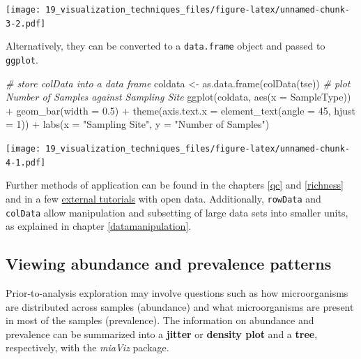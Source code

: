 \documentclass[
]{book}
\newenvironment{Shaded}{\begin{snugshade}}{\end{snugshade}}
\newcommand{\AttributeTok}[1]{\textcolor[rgb]{0.77,0.63,0.00}{#1}}
\newcommand{\CommentTok}[1]{\textcolor[rgb]{0.56,0.35,0.01}{\textit{#1}}}
\newcommand{\DecValTok}[1]{\textcolor[rgb]{0.00,0.00,0.81}{#1}}
\newcommand{\FloatTok}[1]{\textcolor[rgb]{0.00,0.00,0.81}{#1}}
\newcommand{\FunctionTok}[1]{\textcolor[rgb]{0.00,0.00,0.00}{#1}}
\newcommand{\NormalTok}[1]{#1}
\newcommand{\OtherTok}[1]{\textcolor[rgb]{0.56,0.35,0.01}{#1}}
\newcommand{\SpecialCharTok}[1]{\textcolor[rgb]{0.00,0.00,0.00}{#1}}
\newcommand{\StringTok}[1]{\textcolor[rgb]{0.31,0.60,0.02}{#1}}
\begin{document}
\texttt{[image: 19\_visualization\_techniques\_files/figure-latex/unnamed-chunk-3-2.pdf]}

Alternatively, they can be converted to a \texttt{data.frame} object and passed to \texttt{ggplot}.

\begin{Shaded}
\begin{Highlighting}[]
\CommentTok{\# store colData into a data frame}
\NormalTok{coldata }\OtherTok{\textless{}{-}} \FunctionTok{as.data.frame}\NormalTok{(}\FunctionTok{colData}\NormalTok{(tse))}
\CommentTok{\# plot Number of Samples against Sampling Site}
\FunctionTok{ggplot}\NormalTok{(coldata, }\FunctionTok{aes}\NormalTok{(}\AttributeTok{x =}\NormalTok{ SampleType)) }\SpecialCharTok{+}
  \FunctionTok{geom\_bar}\NormalTok{(}\AttributeTok{width =} \FloatTok{0.5}\NormalTok{) }\SpecialCharTok{+}
  \FunctionTok{theme}\NormalTok{(}\AttributeTok{axis.text.x =} \FunctionTok{element\_text}\NormalTok{(}\AttributeTok{angle =} \DecValTok{45}\NormalTok{, }\AttributeTok{hjust =} \DecValTok{1}\NormalTok{)) }\SpecialCharTok{+}
  \FunctionTok{labs}\NormalTok{(}\AttributeTok{x =} \StringTok{"Sampling Site"}\NormalTok{,}
       \AttributeTok{y =} \StringTok{"Number of Samples"}\NormalTok{)}
\end{Highlighting}
\end{Shaded}

\texttt{[image: 19\_visualization\_techniques\_files/figure-latex/unnamed-chunk-4-1.pdf]}

Further methods of application can be found in the chapters \ref{qc} and
\ref{richness} and in a few \href{https://github.com/davismcc/scater_tutorials_open_data}{external tutorials}
with open data. Additionally, \texttt{rowData} and \texttt{colData} allow manipulation and
subsetting of large data sets into smaller units, as explained in chapter \ref{datamanipulation}.

\hypertarget{viewing-abundance-and-prevalence-patterns}{%
\subsection{Viewing abundance and prevalence patterns}\label{viewing-abundance-and-prevalence-patterns}}

Prior-to-analysis exploration may involve questions such as how microorganisms
are distributed across samples (abundance) and what microorganisms are present
in most of the samples (prevalence). The information on abundance and prevalence
can be summarized into a \textbf{jitter} or \textbf{density plot} and a \textbf{tree},
respectively, with the \emph{miaViz} package.
\end{document}
